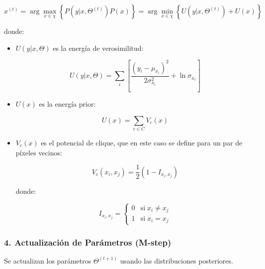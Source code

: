 $$x^{(t)} =\arg \max_{x\in \chi } \left\lbrace P(y|x,\Theta^{(t)} )P(x)\right\rbrace =\arg \min_{x\in \chi } \left\lbrace U(y|x,\Theta^{(t)} )+U(x)\right\rbrace$$

donde:

\begin{itemize}
\setlength{\itemsep}{-1ex}
    \item{\begin{flushleft} $U(y|x,\Theta )$ es la energía de verosimilitud: \end{flushleft}}

    $$U(y|x,\Theta )=\sum_i \left\lbrack \frac{(y_i -\mu_{x_i } )^2 }{2\sigma_{x_i }^2 }+\ln \sigma_{x_i } \right\rbrack$$

    \item{\begin{flushleft} $U(x)$ es la energía prior: \end{flushleft}}

    $$U(x)=\sum_{c\in C} V_c (x)$$

    \item{\begin{flushleft} $V_c (x)$ es el potencial de clique, que en este caso se define para un par de píxeles vecinos: \end{flushleft}}

    $$V_c (x_i ,x_j )=\frac{1}{2}(1-I_{x_i ,x_j } )$$
    
    donde:
    
    \begin{par}
    $$I_{x_i ,x_j } =\left\lbrace \begin{array}{cc}
    0 & \textrm{si}\;x_i \not= x_j \\
    1 & \textrm{si}\;x_i =x_j 
    \end{array}\right.$$
    \end{par}
\end{itemize}

\subsubsection{4. Actualización de Parámetros (M-step)}

Se actualizan los parámetros $\Theta^{(t+1)}$ usando las distribuciones posteriores.

